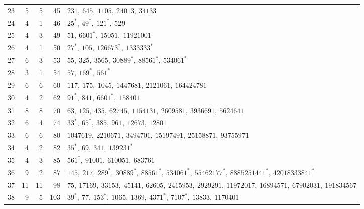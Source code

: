 \documentclass[11pt]{article}
\begin{document}
\begin{longtable}{r r r r >{\raggedright\arraybackslash}p{}}
23&5&5&45&$231,\allowbreak\ 645,\allowbreak\ 1105,\allowbreak\ 24013,\allowbreak\ 34133$\\
24&4&1&46&$25^{\ast},\allowbreak\ 49^{\ast},\allowbreak\ 121^{\ast},\allowbreak\ 529$\\
25&4&3&49&$51,\allowbreak\ 6601^{\ast},\allowbreak\ 15051,\allowbreak\ 11921001$\\
26&4&1&50&$27^{\ast},\allowbreak\ 105,\allowbreak\ 126673^{\ast},\allowbreak\ 1333333^{\ast}$\\
27&6&3&53&$55,\allowbreak\ 325,\allowbreak\ 3565,\allowbreak\ 30889^{\ast},\allowbreak\ 88561^{\ast},\allowbreak\ 534061^{\ast}$\\
28&3&1&54&$57,\allowbreak\ 169^{\ast},\allowbreak\ 561^{\ast}$\\
29&6&6&60&$117,\allowbreak\ 175,\allowbreak\ 1045,\allowbreak\ 1447681,\allowbreak\ 2121061,\allowbreak\ 164424781$\\
30&4&2&62&$91^{\ast},\allowbreak\ 841,\allowbreak\ 6601^{\ast},\allowbreak\ 158401$\\
31&8&8&70&$63,\allowbreak\ 125,\allowbreak\ 435,\allowbreak\ 62745,\allowbreak\ 1154131,\allowbreak\ 2609581,\allowbreak\ 3936691,\allowbreak\ 5624641$\\
32&6&4&74&$33^{\ast},\allowbreak\ 65^{\ast},\allowbreak\ 385,\allowbreak\ 961,\allowbreak\ 12673,\allowbreak\ 12801$\\
33&6&6&80&$1047619,\allowbreak\ 2210671,\allowbreak\ 3494701,\allowbreak\ 15197491,\allowbreak\ 25158871,\allowbreak\ 93755971$\\
34&4&2&82&$35^{\ast},\allowbreak\ 69,\allowbreak\ 341,\allowbreak\ 139231^{\ast}$\\
35&4&3&85&$561^{\ast},\allowbreak\ 91001,\allowbreak\ 610051,\allowbreak\ 683761$\\
36&9&2&87&$145,\allowbreak\ 217,\allowbreak\ 289^{\ast},\allowbreak\ 30889^{\ast},\allowbreak\ 88561^{\ast},\allowbreak\ 534061^{\ast},\allowbreak\ 55462177^{\ast},\allowbreak\ 8885251441^{\ast},\allowbreak\ 42018333841^{\ast}$\\
37&11&11&98&$75,\allowbreak\ 17169,\allowbreak\ 33153,\allowbreak\ 45141,\allowbreak\ 62605,\allowbreak\ 2415953,\allowbreak\ 2929291,\allowbreak\ 11972017,\allowbreak\ 16894571,\allowbreak\ 67902031,\allowbreak\ 191834567$\\
38&9&5&103&$39^{\ast},\allowbreak\ 77,\allowbreak\ 153^{\ast},\allowbreak\ 1065,\allowbreak\ 1369,\allowbreak\ 4371^{\ast},\allowbreak\ 7107^{\ast},\allowbreak\ 13833,\allowbreak\ 1170401$\\

\end{longtable}
\end{document}
